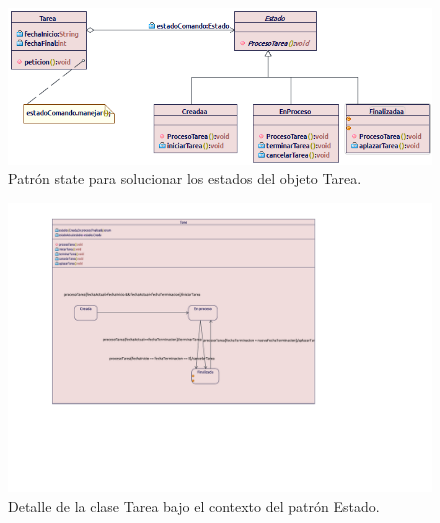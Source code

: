 \begin{figure}[H]
	\centering
	\includegraphics[width=1\linewidth]{diseno/estados/imgs/PatronState}
	\caption{Patrón state para solucionar los estados del objeto Tarea.}
	\label{fig:gantt}
\end{figure}

\begin{figure}[H]
	\centering
	\includegraphics[width=1\linewidth]{diseno/estados/imgs/loquesea.pdf}
	\caption{Detalle de la clase Tarea bajo el contexto del patrón Estado.}
	\label{fig:gantt}
\end{figure}